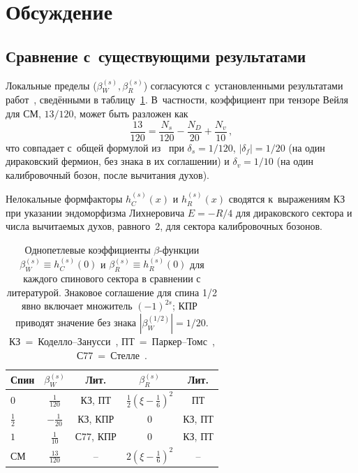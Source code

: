 \documentclass[12pt,a4paper]{article}
\begin{document}
\section{Обсуждение}
\label{sec:discussion}

\subsection{Сравнение с~существующими результатами}

Локальные пределы ($\beta_W^{(s)}, \beta_R^{(s)}$) согласуются
с~установленными результатами
работ~\cite{Stelle:1976gc,Codello:2008vh,Parker:2009uva,Avramidi:2000bm},
сведёнными в таблицу~\ref{tab:beta}.
В~частности, коэффициент при тензоре Вейля для СМ, $13/120$, может быть
разложен как
\begin{equation}
  \frac{13}{120} = \frac{N_s}{120}
    - \frac{N_D}{20} + \frac{N_v}{10}\,,
\end{equation}
что совпадает с~общей формулой из~\cite{Codello:2008vh} при
$\delta_s = 1/120$, $|\delta_f| = 1/20$ (на один дираковский фермион,
без знака в их соглашении) и $\delta_v = 1/10$ (на один калибровочный бозон,
после вычитания духов).

Нелокальные формфакторы $h_C^{(s)}(x)$ и $h_R^{(s)}(x)$ сводятся к~выражениям
КЗ~\cite{Codello:2012kq} при указании эндоморфизма Лихнеровича
$E = -R/4$ для дираковского сектора и числа вычитаемых духов, равного~2, для
сектора калибровочных бозонов.

\begin{table}[t]
\caption{Однопетлевые коэффициенты $\beta$-функции $\beta_W^{(s)} \equiv
h_C^{(s)}(0)$ и $\beta_R^{(s)} \equiv h_R^{(s)}(0)$ для каждого спинового
сектора в сравнении с литературой. Знаковое соглашение для спина 1/2 явно
включает множитель $(-1)^{2s}$; КПР~\cite{Codello:2008vh} приводят значение
без знака $|\beta_W^{(1/2)}| = 1/20$.
КЗ~=~Коделло--Занусси~\cite{Codello:2012kq},
ПТ~=~Паркер--Томс~\cite{Parker:2009uva},
С77~=~Стелле~\cite{Stelle:1976gc}.}
\label{tab:beta}
\centering
\renewcommand{\arraystretch}{1.3}
\begin{tabular}{@{}lcccc@{}}
\toprule
Спин & $\beta_W^{(s)}$ & Лит. & $\beta_R^{(s)}$ & Лит. \\
\midrule
$0$ & $\frac{1}{120}$ & КЗ, ПТ &
  $\frac{1}{2}\!\left(\xi\!-\!\frac{1}{6}\right)^{\!2}$ & ПТ \\[3pt]
$\frac{1}{2}$ & $-\frac{1}{20}$ & КЗ, КПР &
  $0$ & КЗ, ПТ \\[3pt]
$1$ & $\frac{1}{10}$ & С77, КПР &
  $0$ & КЗ, ПТ \\[3pt]
\midrule
СМ & $\frac{13}{120}$ & -- &
  $2\!\left(\xi\!-\!\frac{1}{6}\right)^{\!2}$ & -- \\
\bottomrule
\end{tabular}
\end{table}
\end{document}
